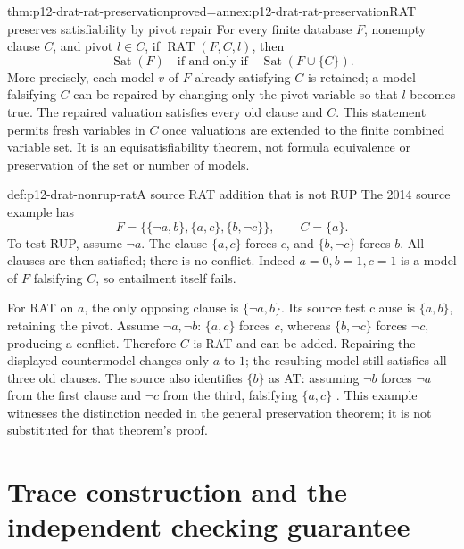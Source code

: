 \begin{hbtheorem}{thm:p12-drat-rat-preservation}{proved=annex:p12-drat-rat-preservation}{RAT preserves satisfiability by pivot repair}
For every finite database \(F\), nonempty clause \(C\), and pivot
\(l\in C\), if \(\operatorname{RAT}(F,C,l)\), then
\[
 \operatorname{Sat}(F)\quad\text{if and only if}\quad
 \operatorname{Sat}(F\cup\{C\}).
\]
More precisely, each model \(v\) of \(F\) already satisfying \(C\) is
retained; a model falsifying \(C\) can be repaired by changing only the
pivot variable so that \(l\) becomes true.  The repaired valuation satisfies
every old clause and \(C\).  This statement permits fresh variables in
\(C\) once valuations are extended to the finite combined variable set.
It is an equisatisfiability theorem, not formula equivalence or preservation
of the set or number of models.
\end{hbtheorem}

\begin{hbexample}{def:p12-drat-nonrup-rat}{A source RAT addition that is not RUP}
The 2014 source example has
\[
 F=\{\{\neg a,b\},\{a,c\},\{b,\neg c\}\},\qquad C=\{a\}.
\]
To test RUP, assume \(\neg a\).  The clause \(\{a,c\}\) forces
\(c\), and \(\{b,\neg c\}\) forces \(b\).  All clauses are then
satisfied; there is no conflict.  Indeed \(a=0,b=1,c=1\) is a model of
\(F\) falsifying \(C\), so entailment itself fails.

For RAT on \(a\), the only opposing clause is \(\{\neg a,b\}\).
Its source test clause is \(\{a,b\}\), retaining the pivot.  Assume
\(\neg a,\neg b\): \(\{a,c\}\) forces \(c\), whereas
\(\{b,\neg c\}\) forces \(\neg c\), producing a conflict.  Therefore
\(C\) is RAT and can be added.  Repairing the displayed countermodel
changes only \(a\) to \(1\); the resulting model still satisfies all three
old clauses.  The source also identifies \(\{b\}\) as AT: assuming
\(\neg b\) forces \(\neg a\) from the first clause and \(\neg c\)
from the third, falsifying \(\{a,c\}\)
\cite[Example~1]{WetzlerHeuleHunt2014AuthorDRAT}.
This example witnesses the distinction needed in the general preservation
theorem; it is not substituted for that theorem's proof.
\end{hbexample}

\section{Trace construction and the independent checking guarantee}

